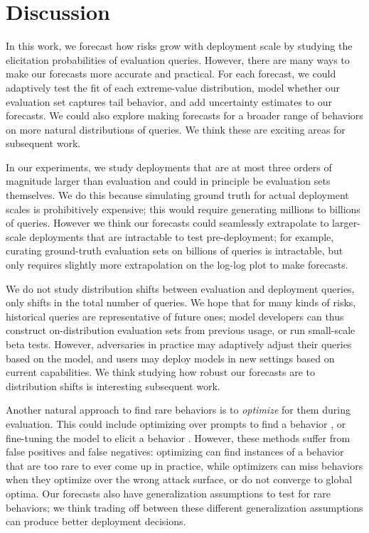 \section{Discussion}
\label{sec:discussion}
In this work, we forecast how risks grow with deployment scale by studying the elicitation probabilities of evaluation queries. 
However, there are many ways to make our forecasts more accurate and practical. 
For each forecast, we could adaptively test the fit of each extreme-value distribution, model whether our evaluation set captures tail behavior, and add uncertainty estimates to our forecasts. 
We could also explore making forecasts for a broader range of behaviors on more natural distributions of queries. 
We think these are exciting areas for subsequent work. 

In our experiments, we study deployments that are at most three orders of magnitude larger than evaluation and could in principle be evaluation sets themselves. 
We do this because simulating ground truth for actual deployment scales is prohibitively expensive; this would require generating millions to billions of queries. 
However we think our forecasts could seamlessly extrapolate to larger-scale deployments that are intractable to test pre-deployment; for example, curating ground-truth evaluation sets on billions of queries is intractable, but only requires slightly more extrapolation on the log-log plot to make forecasts.  

We do not study distribution shifts between evaluation and deployment queries, only shifts in the total number of queries. 
We hope that for many kinds of risks, historical queries are representative of future ones; model developers can thus construct on-distribution evaluation sets from previous usage, or run small-scale beta tests.  
However, adversaries in practice may adaptively adjust their queries based on the model, and users may deploy models in new settings based on current capabilities. 
We think studying how robust our forecasts are to distribution shifts is interesting subsequent work. 

Another natural approach to find rare behaviors is to \emph{optimize} for them during evaluation. This could include optimizing over prompts to find a behavior \citep{jones2023arca, zou2023universal}, or fine-tuning the model to elicit a behavior \citep{greenblatt2024stress}. 
However, these methods suffer from false positives and false negatives: optimizing can find instances of a behavior that are too rare to ever come up in practice, while optimizers can miss behaviors when they optimize over the wrong attack surface, or do not converge to global optima. 
Our forecasts also have generalization assumptions to test for rare behaviors; we think trading off between these different generalization assumptions can produce better deployment decisions. 

